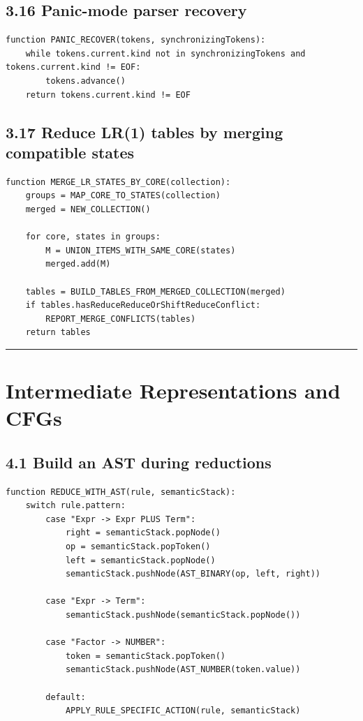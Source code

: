 \documentclass[10pt,letterpaper]{article}
\begin{document}
\subsection*{3.16 Panic-mode parser recovery}

\begin{verbatim}
function PANIC_RECOVER(tokens, synchronizingTokens):
    while tokens.current.kind not in synchronizingTokens and tokens.current.kind != EOF:
        tokens.advance()
    return tokens.current.kind != EOF
\end{verbatim}

\subsection*{3.17 Reduce LR(1) tables by merging compatible states}

\begin{verbatim}
function MERGE_LR_STATES_BY_CORE(collection):
    groups = MAP_CORE_TO_STATES(collection)
    merged = NEW_COLLECTION()

    for core, states in groups:
        M = UNION_ITEMS_WITH_SAME_CORE(states)
        merged.add(M)

    tables = BUILD_TABLES_FROM_MERGED_COLLECTION(merged)
    if tables.hasReduceReduceOrShiftReduceConflict:
        REPORT_MERGE_CONFLICTS(tables)
    return tables
\end{verbatim}

\medskip\hrule\medskip

\clearpage
\section{Intermediate Representations and CFGs}

\subsection*{4.1 Build an AST during reductions}

\begin{verbatim}
function REDUCE_WITH_AST(rule, semanticStack):
    switch rule.pattern:
        case "Expr -> Expr PLUS Term":
            right = semanticStack.popNode()
            op = semanticStack.popToken()
            left = semanticStack.popNode()
            semanticStack.pushNode(AST_BINARY(op, left, right))

        case "Expr -> Term":
            semanticStack.pushNode(semanticStack.popNode())

        case "Factor -> NUMBER":
            token = semanticStack.popToken()
            semanticStack.pushNode(AST_NUMBER(token.value))

        default:
            APPLY_RULE_SPECIFIC_ACTION(rule, semanticStack)
\end{verbatim}
\end{document}
